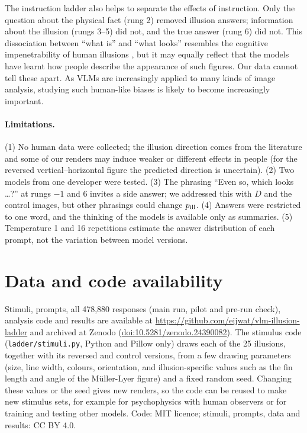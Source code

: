 \documentclass[11pt]{article}
\begin{document}
The instruction ladder also helps to separate the effects of instruction. Only the question about the physical fact (rung 2)
removed illusion answers; information about the illusion (rungs 3--5) did not, and the true answer (rung 6) did not.
This dissociation between ``what is'' and ``what looks'' resembles the cognitive impenetrability of human illusions
\citep{pylyshyn1999,firestone2016}, but it may equally reflect that the models have learnt how people describe the
appearance of such figures. Our data cannot tell these apart. As VLMs are increasingly applied to many kinds of image analysis, studying such human-like biases is likely to become increasingly important.

\paragraph{Limitations.} (1) No human data were collected; the illusion direction comes from the literature and some
of our renders may induce weaker or different effects in people (for the reversed vertical--horizontal figure the
predicted direction is uncertain). (2) Two models from one developer were tested. (3) The phrasing ``Even so, which
looks \dots?'' at rungs $-1$ and 6 invites a side answer; we addressed this with $D$ and the control images, but other
phrasings could change $p_{\rm ill}$. (4) Answers were restricted to one word, and the thinking of the models is
available only as summaries. (5) Temperature 1 and 16 repetitions estimate the answer distribution of each prompt, not
the variation between model versions.

\section*{Data and code availability}
Stimuli, prompts, all 478,880 responses (main run, pilot and pre-run check), analysis code and results are available
at \url{https://github.com/eijwat/vlm-illusion-ladder} and archived at Zenodo (\href{https://doi.org/10.5281/zenodo.24390082}{doi:10.5281/zenodo.24390082}). The stimulus code
(\texttt{ladder/stimuli.py}, Python and Pillow only) draws each of the 25 illusions, together with its reversed and control versions,
from a few drawing parameters (size, line width, colours, orientation, and illusion-specific values such as the fin
length and angle of the Müller-Lyer figure) and a fixed random seed. Changing these values or the seed gives new
renders, so the code can be reused to make new stimulus sets, for example for psychophysics with human observers or for
training and testing other models. Code: MIT licence;
stimuli, prompts, data and results: CC BY 4.0.
\end{document}
